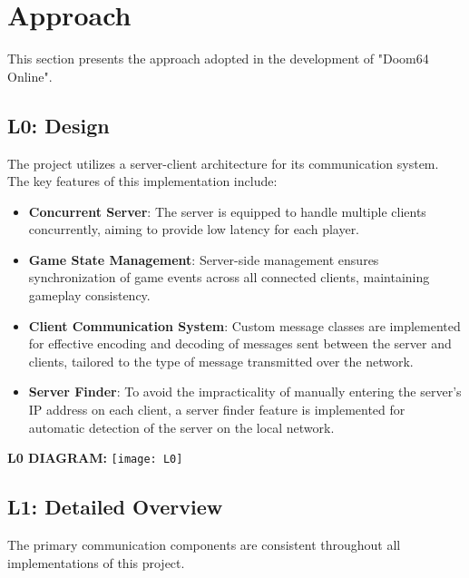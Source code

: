 \section{Approach}
\label{chap:approach}

This section presents the approach adopted in the development of "Doom64 Online".

\subsection{L0: Design}
The project utilizes a server-client architecture for its communication system. The key features of this implementation include:

\begin{itemize}
    \item \textbf{Concurrent Server}: The server is equipped to handle multiple clients concurrently, aiming to provide low latency for each player.
    \item \textbf{Game State Management}: Server-side management ensures synchronization of game events across all connected clients, maintaining gameplay consistency.
    \item \textbf{Client Communication System}: Custom message classes are implemented for effective encoding and decoding of messages sent between the server and clients, tailored to the type of message transmitted over the network.
    \item \textbf{Server Finder}: To avoid the impracticality of manually entering the server's IP address on each client, a server finder feature is implemented for automatic detection of the server on the local network.
\end{itemize}


\textbf{L0 DIAGRAM:}
\newline 
\hfill \break
\texttt{[image: L0]}


\subsection{L1: Detailed Overview}
The primary communication components are consistent throughout all implementations of this project.

